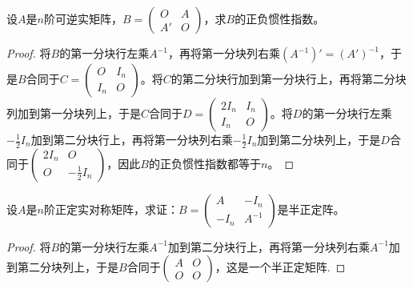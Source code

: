 \documentclass[../../main.tex]{subfiles}%
\begin{document}
\begin{example}
设\(A\)是\(n\)阶可逆实矩阵，\(B = \begin{pmatrix}
O & A \\
A' & O
\end{pmatrix}\)，求\(B\)的正负惯性指数。
\end{example}
\begin{proof}
将\(B\)的第一分块行左乘\(A^{-1}\)，再将第一分块列右乘\((A^{-1})'=(A')^{-1}\)，于是\(B\)合同于\(C = \begin{pmatrix}
O & I_n \\
I_n & O
\end{pmatrix}\)。将\(C\)的第二分块行加到第一分块行上，再将第二分块列加到第一分块列上，于是\(C\)合同于\(D = \begin{pmatrix}
2I_n & I_n \\
I_n & O
\end{pmatrix}\)。将\(D\)的第一分块行左乘\(-\frac{1}{2}I_n\)加到第二分块行上，再将第一分块列右乘\(-\frac{1}{2}I_n\)加到第二分块列上，于是\(D\)合同于\(\begin{pmatrix}
2I_n & O \\
O & -\frac{1}{2}I_n
\end{pmatrix}\)，因此\(B\)的正负惯性指数都等于\(n\)。
\end{proof}

\begin{proposition}\label{proposition:正定阵构造半正定阵}
设\(A\)是\(n\)阶正定实对称矩阵，求证：\(B = \begin{pmatrix}
A & -I_n \\
-I_n & A^{-1}
\end{pmatrix}\)是半正定阵。
\end{proposition} 
\begin{proof}
将\(B\)的第一分块行左乘\(A^{-1}\)加到第二分块行上，再将第一分块列右乘\(A^{-1}\)加到第二分块列上，于是\(B\)合同于\(\begin{pmatrix}
A & O \\
O & O
\end{pmatrix}\)，这是一个半正定矩阵.
\end{proof}
\end{document}

